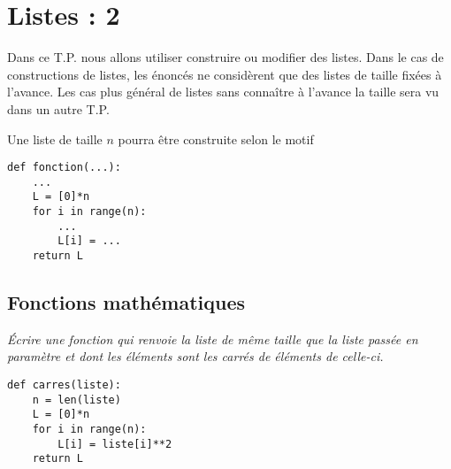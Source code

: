 \chapter{Listes : 2}
\thispagestyle{empty}
{\sf Dans ce T.P. nous allons utiliser construire ou modifier des listes. Dans le cas de constructions de listes, les énoncés ne considèrent que des listes de taille fixées à l'avance. Les cas plus général de listes sans connaître à l'avance la taille sera vu dans un autre T.P. 

Une liste de taille $n$ pourra être construite selon le motif
\begin{lstlisting}
def fonction(...):
    ...
    L = [0]*n
    for i in range(n):
        ...
        L[i] = ...
    return L
\end{lstlisting}
}
\section{Fonctions mathématiques} 
\begin{Exercise}[title = Carrés]
\it Écrire une fonction  qui renvoie la liste de même taille que la liste passée en paramètre et dont les éléments sont les carrés de éléments de celle-ci.
\end{Exercise}
\begin{Answer}
\begin{lstlisting}
def carres(liste):
    n = len(liste)
    L = [0]*n
    for i in range(n):
        L[i] = liste[i]**2
    return L
\end{lstlisting}
\end{Answer}

